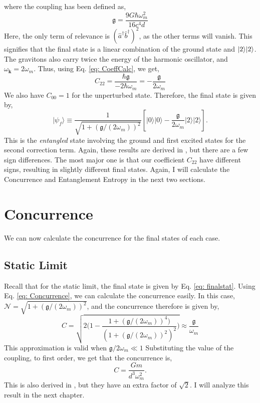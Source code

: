 \documentclass[12pt,a4paper]{report}
\theoremstyle{plain}
\theoremstyle{definition}
\theoremstyle{remark}
\renewcommand{\dag}{\dagger}
\newcommand{\ahat}{\hat{a}}
\newcommand{\bhat}{\hat{b}}
\newcommand{\g}{\mathfrak{g}}
\DeclarePairedDelimiter\ket{\lvert}{\rangle}
\begin{document}
where the coupling has been  defined as,
\begin{equation}
    \g = \frac{9G\hbar\omega_m^2}{16c^4d}
\end{equation}
Here, the only term of relevance is $(\ahat^{\dag}\bhat^{\dag})^2$, as the other terms will vanish. This signifies that the final state is a linear combination of the ground state and $\ket{2}\ket{2}$. The gravitons also carry twice the energy of the harmonic oscillator, and $\omega_{\bm{k}} = 2\omega_m$. Thus, using Eq. \ref{eq: CoeffCalc}, we get,
\begin{equation}
    C_{22} = \frac{\hbar\g}{-2\hbar\omega_m} = -\frac{\g}{2\omega_m}
\end{equation}
We also have $C_{00} = 1$ for the unperturbed state. Therefore, the final state is given by,
\begin{equation}\label{eq: finalns2}
    \vert\psi_{f}\rangle\equiv\frac{1}{\sqrt{1+(\mathfrak{g}/(2\omega_{m}))^{2}}}[\vert0\rangle\vert0\rangle-\frac{\mathfrak{g}}{2\omega_{m}}\vert2\rangle\vert2\rangle].
\end{equation}
This is the \textit{entangled} state involving the ground and first excited states for the second correction term. Again, these results are derived in \citet{Bose_2022}, but there are a few sign differences. The most major one is that our coefficient $C_{22}$ have different signs, resulting in slightly different final states. Again, I will calculate the Concurrence and Entanglement Entropy in the next two sections.
\section{Concurrence} \label{sec: Conc}
We can now calculate the concurrence for the final states of each case.
\subsection{Static Limit}
Recall that for the static limit, the final state is given by Eq. \ref{eq: finalstat}.
Using Eq. \ref{eq: Concurrence}, we can calculate the concurrence easily.
In this case, $\mathcal{N} = \sqrt{1+(\mathfrak{g}/(2\omega_{m}))^{2}}$, and the concurrence therefore is given by,
\begin{equation}
    C = \sqrt{2\Bigg(1- \frac{1+(\mathfrak{g}/(2\omega_{m}))^{4})}{(1+(\mathfrak{g}/(2\omega_{m}))^{2})^2}\Bigg)} \approx \frac{\mathfrak{g}}{\omega_{m}}
\end{equation}
This approximation is valid when $\mathfrak{g}/2\omega_{m} \ll 1$ Substituting the value of the coupling, to first order, we get that the concurrence is,
\begin{equation}
    C = \frac{Gm}{d^3\omega_m^2}.
\end{equation}
This is also derived in \citet{Bose_2022}, but they have an extra factor of $\sqrt{2}$. I will analyze this result in the next chapter.
\end{document}
